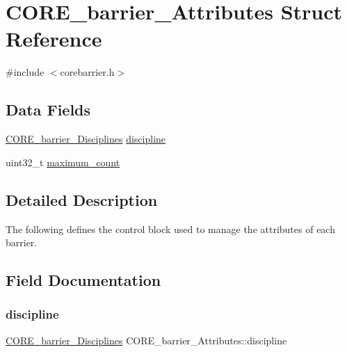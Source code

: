 \hypertarget{structCORE__barrier__Attributes}{}\section{C\+O\+R\+E\+\_\+barrier\+\_\+\+Attributes Struct Reference}
\label{structCORE__barrier__Attributes}


{\ttfamily \#include $<$corebarrier.\+h$>$}

\subsection*{Data Fields}
\begin{DoxyCompactItemize}
\item 
\mbox{\hyperlink{group__RTEMSScoreBarrier_ga48a30f464f6a44bf727e3958a3c0e822}{C\+O\+R\+E\+\_\+barrier\+\_\+\+Disciplines}} \mbox{\hyperlink{structCORE__barrier__Attributes_aaebe568e93bfa0f06a81e1fa7de0530c}{discipline}}
\item 
uint32\+\_\+t \mbox{\hyperlink{structCORE__barrier__Attributes_ae77aa1bd37dbf2739b92d998a3a5ebf8}{maximum\+\_\+count}}
\end{DoxyCompactItemize}


\subsection{Detailed Description}
The following defines the control block used to manage the attributes of each barrier. 

\subsection{Field Documentation}
\mbox{\label{structCORE__barrier__Attributes_aaebe568e93bfa0f06a81e1fa7de0530c}} 
\subsubsection{\texorpdfstring{discipline}{discipline}}
{\footnotesize\ttfamily \mbox{\hyperlink{group__RTEMSScoreBarrier_ga48a30f464f6a44bf727e3958a3c0e822}{C\+O\+R\+E\+\_\+barrier\+\_\+\+Disciplines}} C\+O\+R\+E\+\_\+barrier\+\_\+\+Attributes\+::discipline}

